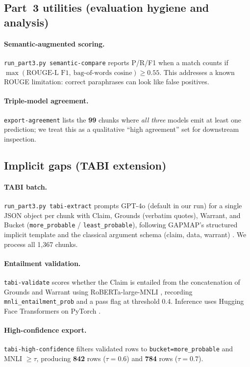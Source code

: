 \documentclass{article}
\begin{document}
\subsection{Part~3 utilities (evaluation hygiene and analysis)}
\paragraph{Semantic-augmented scoring.} \texttt{run\_part3.py semantic-compare} reports P/R/F1 when a match counts if $\max(\text{ROUGE-L F1},\ \text{bag-of-words cosine}) \ge 0.55$. This addresses a known ROUGE limitation: correct paraphrases can look like false positives.

\paragraph{Triple-model agreement.} \texttt{export-agreement} lists the \textbf{99} chunks where \emph{all three} models emit at least one prediction; we treat this as a qualitative ``high agreement'' set for downstream inspection.

\subsection{Implicit gaps (TABI extension)}
\paragraph{TABI batch.} \texttt{run\_part3.py tabi-extract} prompts GPT-4o (default in our run) for a single JSON object per chunk with Claim, Grounds (verbatim quotes), Warrant, and Bucket (\texttt{more\_probable} / \texttt{least\_probable}), following GAPMAP's structured implicit template \citep{salem2025gapmap} and the classical argument schema (claim, data, warrant) \citep{toulmin1958uses}. We process all 1{,}367 chunks.

\paragraph{Entailment validation.} \texttt{tabi-validate} scores whether the Claim is entailed from the concatenation of Grounds and Warrant using RoBERTa-large-MNLI \citep{liu2019roberta,williams2018mnli}, recording \texttt{mnli\_entailment\_prob} and a pass flag at threshold 0.4. Inference uses Hugging Face Transformers on PyTorch \citep{wolf2020transformers,paszke2019pytorch}.

\paragraph{High-confidence export.} \texttt{tabi-high-confidence} filters validated rows to \texttt{bucket=more\_probable} and MNLI $\ge \tau$, producing \textbf{842} rows ($\tau=0.6$) and \textbf{784} rows ($\tau=0.7$).
\end{document}
